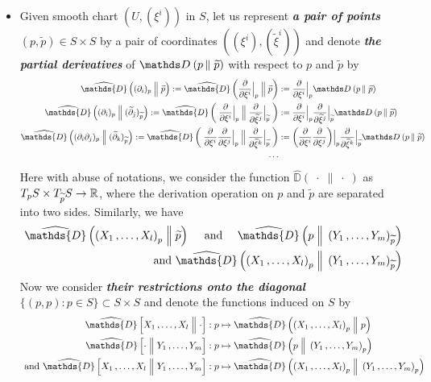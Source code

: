\documentclass[11pt]{article}
\begin{document}
\begin{itemize}
\item Given smooth chart $(U, (\xi^i))$ in $S$, let us represent \emph{\textbf{a pair of points}} $(p, \widetilde{p}) \in S \times S$ by a pair of coordinates $((\xi^i), (\widetilde{\xi}^i))$ and denote \emph{\textbf{the partial derivatives}} of $\divg{}{p}{\widetilde{p}}$ with respect to $p$ and $\widetilde{p}$ by
\begin{align*}
\widehat{\mathds{D}}\left( (\partial_i)_p \;\Bigr\|\;  \widetilde{p} \right) :=\widehat{\mathds{D}}\left( \partdiff{}{\xi^i}\Bigr|_{p} \;\Bigr\|\;  \widetilde{p} \right) &:= \partdiff{}{\xi^i}\Bigr|_{p}\divg{}{p}{\widetilde{p}} \\
\widehat{\mathds{D}}\left( (\partial_i)_p \;\Bigr\|\;  (\widetilde{\partial}_j)_{\widetilde{p}}  \right)  := \widehat{\mathds{D}}\left( \;\partdiff{}{\xi^i}\Bigr|_{p} \;\Bigr\| \; \partdiff{}{\widetilde{\xi}^j}\Bigr|_{\widetilde{p}} \;\right) &:= \partdiff{}{\xi^i}\Bigr|_{p} \partdiff{}{\widetilde{\xi}^j}\Bigr|_{\widetilde{p}}  \divg{}{p}{\widetilde{p}} \\
\widehat{\mathds{D}}\left( (\partial_i\partial_j)_p \;\Bigr\|\;  (\widetilde{\partial}_k)_{\widetilde{p}}  \right) := \widehat{\mathds{D}}\left( \;\partdiff{}{\xi^i}\partdiff{}{\xi^j}\Bigr|_{p} \;\Bigr\| \; \partdiff{}{\widetilde{\xi}^k}\Bigr|_{\widetilde{p}} \;\right) &:= \paren{\partdiff{}{\xi^i}\partdiff{}{\xi^j}}\Bigr|_{p}  \partdiff{}{\widetilde{\xi}^k}\Bigr|_{\widetilde{p}}  \divg{}{p}{\widetilde{p}} \\
\cdots 
\end{align*}
Here with abuse of notations, we consider the function $\widehat{\mathds{D}}(\;\cdot \;\|\; \cdot\;) $ as $T_{p}S \times T_{\widetilde{p}}S \rightarrow {\mathbb R}$, where the derivation operation on $p$ and $\widetilde{p}$ are separated into two sides. Similarly, we have
\begin{align*}
\widehat{\mathds{D}}\left( \paren{X_1 \xdotx{,} X_l}_{p} \;\Bigr\|\;  \widetilde{p} \right) \quad \text{ and } \quad  \widehat{\mathds{D}}\left( p \;\Bigr\|\;  \paren{Y_1 \xdotx{,} Y_m}_{\widetilde{p}} \right) \\
\text{ and }\widehat{\mathds{D}}\left( \paren{X_1 \xdotx{,} X_l}_{p} \;\Bigr\|\;   \paren{Y_1 \xdotx{,} Y_m}_{\widetilde{p}} \right)
\end{align*} Now we consider \emph{\textbf{their restrictions onto the diagonal}} $\{(p, p) : p \in S\} \subset S \times S $ and denote the functions induced on $S$ by
\begin{align*}
\widehat{\mathds{D}}\left[ X_1 \xdotx{,} X_l \;\Bigr\|\;  \cdot \right]  &: p \mapsto \widehat{\mathds{D}}\left( \paren{X_1 \xdotx{,} X_l}_{p} \;\Bigr\|\;  p \right)\\
\widehat{\mathds{D}}\left[ \cdot \;\Bigr\|\;  Y_1 \xdotx{,} Y_m \right] &:  p \mapsto \widehat{\mathds{D}}\left( p \;\Bigr\|\;  \paren{Y_1 \xdotx{,} Y_m}_{p} \right) \\
\text{ and }\widehat{\mathds{D}}\left[X_1 \xdotx{,} X_l \;\Bigr\|\;   Y_1 \xdotx{,} Y_m \right] &:  p \mapsto \widehat{\mathds{D}}\left( \paren{X_1 \xdotx{,} X_l}_{p} \;\Bigr\|\;   \paren{Y_1 \xdotx{,} Y_m}_{p} \right)
\end{align*}


\end{itemize}
\end{document}
